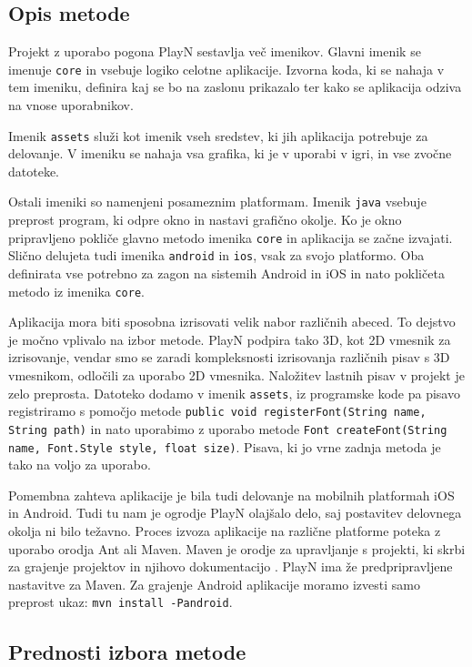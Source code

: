 \subsection{Opis metode}

Projekt z uporabo pogona PlayN sestavlja več imenikov. Glavni imenik se imenuje \texttt{core} in vsebuje logiko celotne aplikacije. Izvorna koda, ki se nahaja v tem imeniku, definira kaj se bo na zaslonu prikazalo ter kako se aplikacija odziva na vnose uporabnikov. 



Imenik \texttt{assets} služi kot imenik vseh sredstev, ki jih aplikacija potrebuje za delovanje. V imeniku se nahaja vsa grafika, ki je v uporabi v igri, in vse zvočne datoteke.

Ostali imeniki so namenjeni posameznim platformam. Imenik \texttt{java} vsebuje preprost program, ki odpre okno in nastavi grafično okolje. Ko je okno pripravljeno pokliče glavno metodo imenika \texttt{core} in aplikacija se začne izvajati. Slično delujeta tudi imenika \texttt{android} in \texttt{ios}, vsak za svojo platformo. Oba definirata vse potrebno za zagon na sistemih Android in iOS in nato pokličeta metodo iz imenika \texttt{core}.

Aplikacija mora biti sposobna izrisovati velik nabor različnih abeced. To dejstvo je močno vplivalo na izbor metode. PlayN podpira tako 3D, kot 2D vmesnik za izrisovanje, vendar smo se zaradi kompleksnosti izrisovanja različnih pisav s 3D vmesnikom, odločili za uporabo 2D vmesnika. Naložitev lastnih pisav v projekt je zelo preprosta. Datoteko dodamo v imenik \texttt{assets}, iz programske kode pa pisavo registriramo s pomočjo metode \texttt{public void registerFont(String name, String path)} in nato uporabimo z uporabo metode \texttt{Font createFont(String name, Font.Style style, float size)}. Pisava, ki jo vrne zadnja metoda je tako na voljo za uporabo.

Pomembna zahteva aplikacije je bila tudi delovanje na mobilnih platformah iOS in Android. Tudi tu nam je ogrodje PlayN olajšalo delo, saj postavitev delovnega okolja ni bilo težavno. Proces izvoza aplikacije na različne platforme poteka z uporabo orodja Ant ali Maven. Maven je orodje za upravljanje s projekti, ki skrbi za grajenje projektov in njihovo dokumentacijo \cite{mvn}. PlayN ima že predpripravljene nastavitve za Maven. Za grajenje Android aplikacije moramo izvesti samo preprost ukaz: \texttt{mvn install -Pandroid}. 

\subsection{Prednosti izbora metode}

